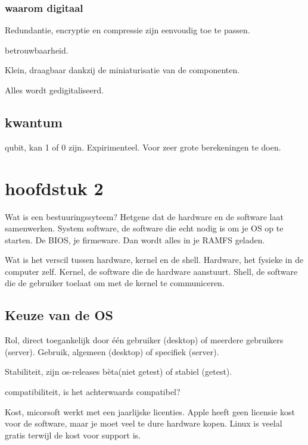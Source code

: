 \documentclass{article}
\begin{document}
\subsubsection{waarom digitaal}
Redundantie, encryptie en compressie zijn eenvoudig toe te passen.

betrouwbaarheid.

Klein, draagbaar dankzij de miniaturisatie van de componenten.

Alles wordt gedigitaliseerd.

\subsection{kwantum}
qubit, kan 1 of 0 zijn. Expirimenteel.
Voor zeer grote berekeningen te doen.

\section{hoofdstuk 2}
Wat is een bestuuringssyteem? Hetgene dat de hardware en de software laat samenwerken.
System software, de software die echt nodig is om je OS op te starten. De BIOS, je firmeware. Dan wordt alles in je RAMFS geladen.

Wat is het verscil tussen hardware, kernel en de shell.
Hardware, het fysieke in de computer zelf.
Kernel, de software die de hardware aanstuurt.
Shell, de software die de gebruiker toelaat om met de kernel te communiceren.

\subsection{Keuze van de OS}

Rol, direct toegankelijk door één gebruiker (desktop) of meerdere gebruikers (server).
Gebruik, algemeen (desktop) of specifiek (server). 

Stabiliteit, zijn os-releases bèta(niet getest) of stabiel (getest).

compatibiliteit, is het achterwaards compatibel?

Kost, micorsoft werkt met een jaarlijske licenties.
Apple heeft geen licensie kost voor de software, maar je moet veel te dure hardware kopen.
Linux is veelal gratis terwijl de kost voor support is.
\end{document}
